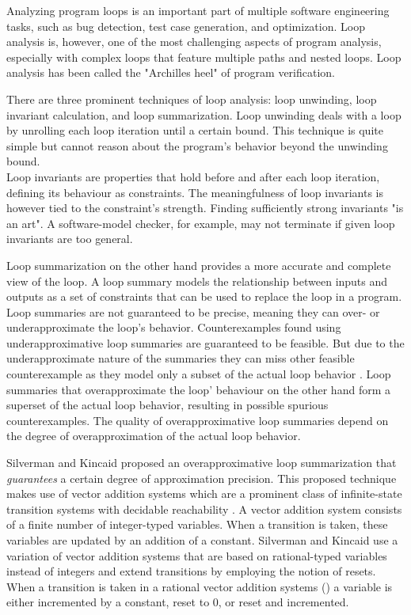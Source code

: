 Analyzing program loops is an important part of multiple software engineering tasks, such as bug detection, test case generation, and optimization. Loop analysis is, however, one of the most challenging aspects of program analysis, especially with complex loops that feature multiple paths and nested loops. Loop analysis has been called the "Archilles heel" of program verification\cite{DBLP:journals/fmsd/KroeningSTTW13}. \par
There are three prominent techniques of loop analysis: loop unwinding, loop invariant calculation, and loop summarization\cite{DBLP:journals/fmsd/KroeningSTTW13 , DBLP:conf/cav/SilvermanK19, DBLP:journals/tse/XieCZLLL19}. Loop unwinding deals with a loop by unrolling each loop iteration until a certain bound. This technique is quite simple but cannot reason about the program's behavior beyond the unwinding bound. \\
Loop invariants are properties that hold before and after each loop iteration, defining its behaviour as constraints. The meaningfulness of loop invariants is however tied to the constraint's strength. Finding sufficiently strong invariants "is an art"\cite{DBLP:journals/fmsd/KroeningSTTW13}. A software-model checker, for example, may not terminate if given loop invariants are too general. \par
Loop summarization on the other hand provides a more accurate and complete view of the loop. A loop summary models the relationship between inputs and outputs as a set of constraints that can be used to replace the loop in a program. Loop summaries are not guaranteed to be precise, meaning they can over- or underapproximate the loop's behavior. Counterexamples found using underapproximative loop summaries are guaranteed to be feasible. But due to the underapproximate nature of the summaries they can miss other feasible counterexample as they model only a subset of the actual loop behavior \cite{DBLP:journals/fmsd/KroeningLW15}. Loop summaries that overapproximate the loop' behaviour on the other hand form a superset of the actual loop behavior, resulting in possible spurious counterexamples. The quality of overapproximative loop summaries depend on the degree of overapproximation of the actual loop behavior. \par
Silverman and Kincaid\cite{DBLP:conf/cav/SilvermanK19} proposed an overapproximative loop summarization that \textsl{guarantees} a certain degree of approximation precision.
This proposed technique makes use of vector addition systems which are a prominent class of infinite-state transition systems with decidable reachability \cite{DBLP:conf/rp/HaaseH14}. A vector addition system consists of a finite number of integer-typed variables. When a transition is taken, these variables are updated by an addition of a constant. Silverman and Kincaid use a variation of vector addition systems that are based on rational-typed variables instead of integers and extend transitions by employing the notion of resets. When a transition is taken in a rational vector addition systems (\qvasr) a variable is either incremented by a constant, reset to 0, or reset and incremented. \par
